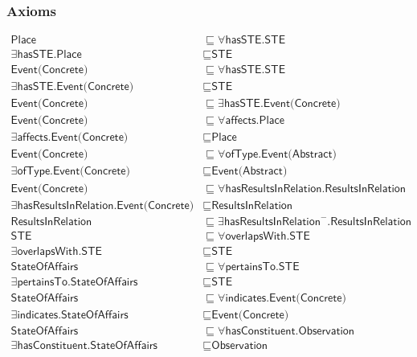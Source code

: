 \subsubsection{Axioms}
\begin{align}
  \textsf{Place} &\sqsubseteq \forall \textsf{hasSTE.STE} \\
  \exists \textsf{hasSTE.Place} &\sqsubseteq \textsf{STE} \\
  \textsf{Event(Concrete)} &\sqsubseteq \forall \textsf{hasSTE.STE} \\
  \exists \textsf{hasSTE.Event(Concrete)} &\sqsubseteq \textsf{STE} \\
  \textsf{Event(Concrete)} &\sqsubseteq \exists \textsf{hasSTE.Event(Concrete)} \\
  \textsf{Event(Concrete)} &\sqsubseteq \forall \textsf{affects.Place} \\
  \exists \textsf{affects.Event(Concrete)} &\sqsubseteq \textsf{Place} \\
  \textsf{Event(Concrete)} &\sqsubseteq \forall \textsf{ofType.Event(Abstract)} \\
  \exists \textsf{ofType.Event(Concrete)} &\sqsubseteq \textsf{Event(Abstract)} \\
  \textsf{Event(Concrete)} &\sqsubseteq \forall \textsf{hasResultsInRelation.ResultsInRelation} \\
  \exists \textsf{hasResultsInRelation.Event(Concrete)} &\sqsubseteq \textsf{ResultsInRelation} \\
  \textsf{ResultsInRelation} &\sqsubseteq \exists \textsf{hasResultsInRelation}^-\textsf{.ResultsInRelation} \\
  \textsf{STE} &\sqsubseteq \forall \textsf{overlapsWith.STE} \\
  \exists \textsf{overlapsWith.STE} &\sqsubseteq \textsf{STE} \\
  \textsf{StateOfAffairs} &\sqsubseteq \forall \textsf{pertainsTo.STE} \\
  \exists \textsf{pertainsTo.StateOfAffairs} &\sqsubseteq \textsf{STE} \\
  \textsf{StateOfAffairs} &\sqsubseteq \forall \textsf{indicates.Event(Concrete)} \\
  \exists \textsf{indicates.StateOfAffairs} &\sqsubseteq \textsf{Event(Concrete)} \\
  \textsf{StateOfAffairs} &\sqsubseteq \forall \textsf{hasConstituent.Observation} \\
  \exists \textsf{hasConstituent.StateOfAffairs} &\sqsubseteq \textsf{Observation} \\

\end{align}
